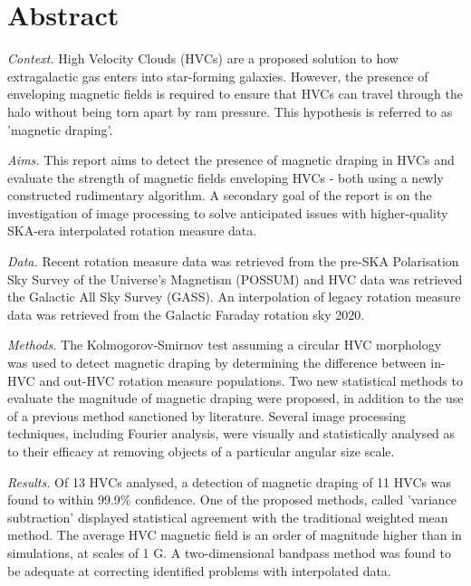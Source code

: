 \chapter*{Abstract}

\textit{Context.} High Velocity Clouds (HVCs) are a proposed solution to how extragalactic gas enters into star-forming galaxies. However, the presence of enveloping magnetic fields is required to ensure that HVCs can travel through the halo without being torn apart by ram pressure. This hypothesis is referred to as 'magnetic draping'.

\textit{Aims.} This report aims to detect the presence of magnetic draping in HVCs and evaluate the strength of magnetic fields enveloping HVCs - both using a newly constructed rudimentary algorithm. A secondary goal of the report is on the investigation of image processing to solve anticipated issues with higher-quality SKA-era interpolated rotation measure data.

\textit{Data.} Recent rotation measure data was retrieved from the pre-SKA Polarisation Sky Survey of the Universe's Magnetism (POSSUM) and HVC data was retrieved the Galactic All Sky Survey (GASS). An interpolation of legacy rotation measure data was retrieved from the Galactic Faraday rotation sky 2020.

\textit{Methods.} The Kolmogorov-Smirnov test assuming a circular HVC morphology was used to detect magnetic draping by determining the difference between in-HVC and out-HVC rotation measure populations. Two new statistical methods to evaluate the magnitude of magnetic draping were proposed, in addition to the use of a previous method sanctioned by literature. Several image processing techniques, including Fourier analysis, were visually and statistically analysed as to their efficacy at removing objects of a particular angular size scale.

\textit{Results.} Of 13 HVCs analysed, a detection of magnetic draping of 11 HVCs was found to within 99.9\% confidence. One of the proposed methods, called 'variance subtraction' displayed statistical agreement with the traditional weighted mean method. The average HVC magnetic field is an order of magnitude higher than in simulations, at scales of 1 \textmu G. A two-dimensional bandpass method was found to be adequate at correcting identified problems with interpolated data.


